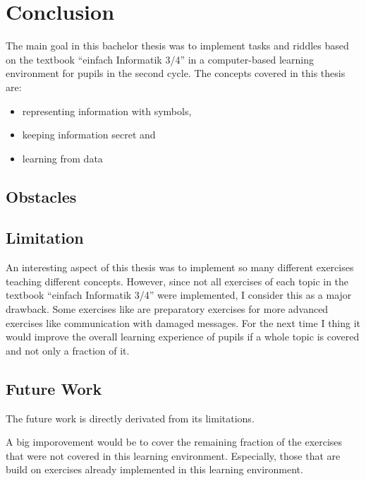 \chapter{Conclusion}
\label{chapter:conclusion}

The main goal in this bachelor thesis was to implement tasks and riddles based on the textbook “einfach Informatik 3/4” in a computer-based learning environment for pupils in the second cycle. The concepts covered in this thesis are:

\begin{itemize}
    \item representing information with symbols,
    \item keeping information secret and
    \item learning from data
\end{itemize}

\section{Obstacles}
\label{section:obstacles}


\section{Limitation}
\label{section:limitation}

An interesting aspect of this thesis was to implement so many different exercises teaching different concepts. However, since not all exercises of each topic in the textbook “einfach Informatik 3/4” were implemented, I consider this as a major drawback. Some exercises like  are preparatory exercises for more advanced exercises like communication with damaged messages. For the next time I thing it would improve the overall learning experience of pupils if a whole topic is covered and not only a fraction of it.


\section{Future Work}
\label{section:futureWork}

The future work is directly derivated from its limitations.

A big imporovement would be to cover the remaining fraction of the exercises that were not covered in this learning environment. Especially, those that are build on exercises already implemented in this learning environment.

